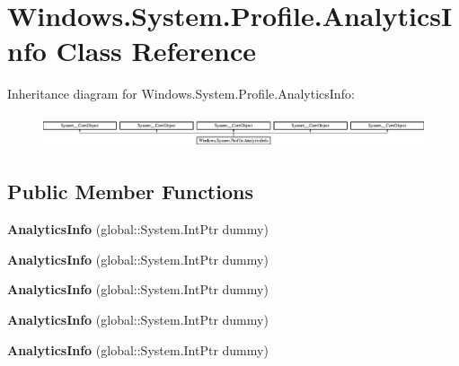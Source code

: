 \hypertarget{class_windows_1_1_system_1_1_profile_1_1_analytics_info}{}\section{Windows.\+System.\+Profile.\+Analytics\+Info Class Reference}
\label{class_windows_1_1_system_1_1_profile_1_1_analytics_info}
Inheritance diagram for Windows.\+System.\+Profile.\+Analytics\+Info\+:\begin{figure}[H]
\begin{center}
\leavevmode
\includegraphics[height=0.965517cm]{class_windows_1_1_system_1_1_profile_1_1_analytics_info}
\end{center}
\end{figure}
\subsection*{Public Member Functions}
\begin{DoxyCompactItemize}
\item 
\mbox{\label{class_windows_1_1_system_1_1_profile_1_1_analytics_info_a2dd52b396dc5f90564bea6196b6cdfb9}} 
{\bfseries Analytics\+Info} (global\+::\+System.\+Int\+Ptr dummy)
\item 
\mbox{\label{class_windows_1_1_system_1_1_profile_1_1_analytics_info_a2dd52b396dc5f90564bea6196b6cdfb9}} 
{\bfseries Analytics\+Info} (global\+::\+System.\+Int\+Ptr dummy)
\item 
\mbox{\label{class_windows_1_1_system_1_1_profile_1_1_analytics_info_a2dd52b396dc5f90564bea6196b6cdfb9}} 
{\bfseries Analytics\+Info} (global\+::\+System.\+Int\+Ptr dummy)
\item 
\mbox{\label{class_windows_1_1_system_1_1_profile_1_1_analytics_info_a2dd52b396dc5f90564bea6196b6cdfb9}} 
{\bfseries Analytics\+Info} (global\+::\+System.\+Int\+Ptr dummy)
\item 
\mbox{\label{class_windows_1_1_system_1_1_profile_1_1_analytics_info_a2dd52b396dc5f90564bea6196b6cdfb9}} 
{\bfseries Analytics\+Info} (global\+::\+System.\+Int\+Ptr dummy)
\end{DoxyCompactItemize}
